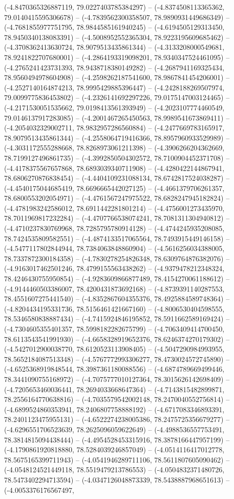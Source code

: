 (-4.8470365326887119, 79.0227403785384297) -- (-4.8374508113365362, 79.0140415595306678) -- (-4.7839562300358507, 78.9890931449686349) -- (-4.7681855977751795, 78.9844585161940245) -- (-4.6194505129313450, 78.9450340138083391) -- (-4.5008952552365304, 78.9223195609685462) -- (-4.3708362413630724, 78.9079513435861344) -- (-4.3133208000549681, 78.9241822707680001) -- (-4.2864193319098201, 78.9340347524461095) -- (-4.2765241423731393, 78.9438718380149282) -- (-4.2687941169325434, 78.9560494978604908) -- (-4.2598262187541600, 78.9867841454206001) -- (-4.2527140164874213, 78.9995429885396447) -- (-4.2428188269507974, 79.0099775836453802) -- (-4.2326141692297226, 79.0175147003124465) -- (-4.2171530051535662, 79.0198413561393949) -- (-4.2023107774460549, 79.0146137917283085) -- (-4.2001467265450563, 78.9989541673869411) -- (-4.2054032329002711, 78.9832957286560884) -- (-4.2477669783165917, 78.9079513435861344) -- (-4.2558064719416366, 78.8957960933529989) -- (-4.3031172555288668, 78.8268973061211398) -- (-4.3906266204362669, 78.7199127496861735) -- (-4.3992850504302572, 78.7100904452371708) -- (-4.4178375567657868, 78.6893039340711908) -- (-4.4280422144867941, 78.6806270876838454) -- (-4.4404109231088134, 78.6742817524038287) -- (-4.4540175044685419, 78.6696665442027125) -- (-4.4661379706261357, 78.6800553202054971) -- (-4.4761567247975522, 78.6828247945182824) -- (-4.4781983242586012, 78.6911442281801214) -- (-4.4756001273435970, 78.7011969817232284) -- (-4.4707766538074241, 78.7081311304940812) -- (-4.4710237830769968, 78.7285795780914128) -- (-4.4744245935208085, 78.7424535809582551) -- (-4.4874133517065564, 78.7493915449146158) -- (-4.5477117802844944, 78.7384063848860904) -- (-4.5616256034388005, 78.7337872300184358) -- (-4.7830278254826348, 78.6309764876382076) -- (-4.9163017462501246, 78.4799155563438262) -- (-4.9379478212348324, 78.4246430755950854) -- (-4.9283609866877489, 78.4154270061188612) -- (-4.9144460503386007, 78.4200431873692168) -- (-4.8739391140287553, 78.4551607275441540) -- (-4.8352867604355376, 78.4925884589748364) -- (-4.8204434195331736, 78.5156461421667160) -- (-4.8006530404598555, 78.5346580838887434) -- (-4.7415924846195852, 78.5911662589169424) -- (-4.7304605355401357, 78.5998182282675799) -- (-4.7063409414700450, 78.6113543541991930) -- (-4.6658328919652376, 78.6246374270179302) -- (-4.5427012900038770, 78.6120523113908405) -- (-4.5047290984993955, 78.5652184087513348) -- (-4.5767772993306277, 78.4730024572745890) -- (-4.6525368919848544, 78.3987361180088556) -- (-4.6874789669499446, 78.3441090755168972) -- (-4.7075777010127364, 78.3015626142698409) -- (-4.7205653460036441, 78.2694033668647364) -- (-4.7143815482899871, 78.2556164770638816) -- (-4.7035579542002148, 78.2470040552756814) -- (-4.6899524860353941, 78.2406807758888192) -- (-4.6717083346893391, 78.2401123475955131) -- (-4.6522274238005386, 78.2475725356679277) -- (-4.6296551706523639, 78.2625096059622649) -- (-4.4988536557753491, 78.3814815094438444) -- (-4.4954528453315916, 78.3878166447957199) -- (-4.1790861920818880, 78.5284039246857049) -- (-4.0514116417012778, 78.5675165399711943) -- (-4.0541946289711106, 78.5611807605090462) -- (-4.0548124521449118, 78.5519479213786553) -- (-4.0504832371480726, 78.5473402294713594) -- (-4.0347126048873339, 78.5438887968651613) -- (-4.0053376176567497, 